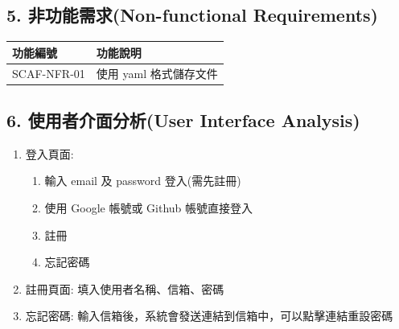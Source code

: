\documentclass{report}
\begin{document}
\subsection*{5. 非功能需求(Non-functional Requirements)}

\begin{tabularx}{\textwidth}{
  |p{}%
  |p{}|%
}
  \hline
  功能編號 &  功能說明 \\ \hline
  SCAF-NFR-01 & 使用 yaml 格式儲存文件 \\ \hline
\end{tabularx}

\subsection*{6. 使用者介面分析(User Interface Analysis)}
\begin{enumerate}
  \item 登入頁面:
    \begin{enumerate}
      \item 輸入 email 及 password 登入(需先註冊)
      \item 使用 Google 帳號或 Github 帳號直接登入
      \item 註冊
      \item 忘記密碼
    \end{enumerate}
  \item 註冊頁面: 填入使用者名稱、信箱、密碼
  \item 忘記密碼: 輸入信箱後，系統會發送連結到信箱中，可以點擊連結重設密碼
\end{enumerate}
\end{document}
